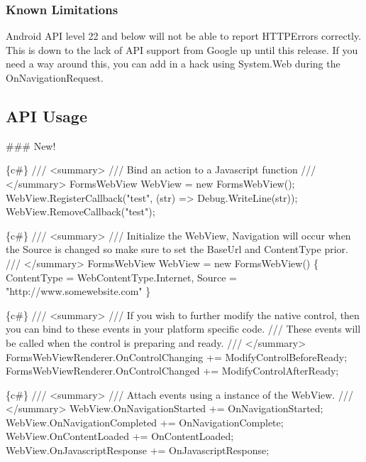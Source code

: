 \subsubsection*{Known Limitations}


\begin{DoxyItemize}
\item Android A\+PI level 22 and below will not be able to report H\+T\+T\+P\+Errors correctly. This is down to the lack of A\+PI support from Google up until this release. If you need a way around this, you can add in a hack using System.\+Web during the On\+Navigation\+Request.
\end{DoxyItemize}

\subsection*{A\+PI Usage}

\#\#\# New! 
\begin{DoxyCode}
\{c#\}
/// <summary>
/// Bind an action to a Javascript function
/// </summary>
FormsWebView WebView = new FormsWebView();
WebView.RegisterCallback("test", (str) => Debug.WriteLine(str));
WebView.RemoveCallback("test");
\end{DoxyCode}



\begin{DoxyCode}
\{c#\}
/// <summary>
/// Initialize the WebView, Navigation will occur when the Source is changed so make sure to set the
       BaseUrl and ContentType prior.
/// </summary>
FormsWebView WebView = new FormsWebView() \{
    ContentType = WebContentType.Internet,
    Source = "http://www.somewebsite.com"
\}
\end{DoxyCode}



\begin{DoxyCode}
\{c#\}
/// <summary>
/// If you wish to further modify the native control, then you can bind to these events in your platform
       specific code.
/// These events will be called when the control is preparing and ready.
/// </summary>
FormsWebViewRenderer.OnControlChanging += ModifyControlBeforeReady;
FormsWebViewRenderer.OnControlChanged += ModifyControlAfterReady;
\end{DoxyCode}



\begin{DoxyCode}
\{c#\}
/// <summary>
/// Attach events using a instance of the WebView.
/// </summary>
WebView.OnNavigationStarted += OnNavigationStarted;
WebView.OnNavigationCompleted += OnNavigationComplete;
WebView.OnContentLoaded += OnContentLoaded;
WebView.OnJavascriptResponse += OnJavascriptResponse;
\end{DoxyCode}



